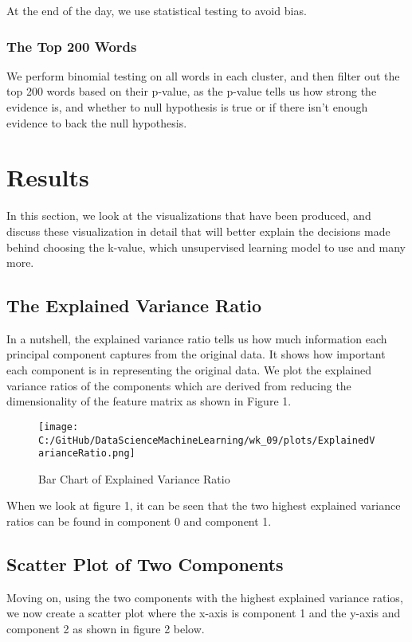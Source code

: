 \documentclass[a4paper, twocolumn]{article}
\begin{document}
\noindent At the end of the day, we use statistical testing to avoid bias.

\subsubsection{The Top 200 Words}
We perform binomial testing on all words in each cluster, and then filter out the top 200 words based on their p-value, as the p-value tells us how strong 
the evidence is, and whether to null hypothesis is true or if there isn't enough evidence to back the null hypothesis.

\section{Results}
In this section, we look at the visualizations that have been produced, and discuss these visualization in detail that will better explain the decisions made
behind choosing the k-value, which unsupervised learning model to use and many more.

\subsection{The Explained Variance Ratio}
In a nutshell, the explained variance ratio tells us how much information each principal component captures from the original data. It shows how important
each component is in representing the original data. We plot the explained variance ratios of the components which are derived from reducing the
dimensionality of the feature matrix as shown in Figure 1.

\begin{figure}[H]
    \centering
    \texttt{[image: C:/GitHub/DataScienceMachineLearning/wk\_09/plots/ExplainedVarianceRatio.png]}
    \caption{Bar Chart of Explained Variance Ratio}
\end{figure}

\vspace{1em}

\noindent When we look at figure 1, it can be seen that the two highest explained variance ratios can be found in component 0 and component 1. 

\subsection{Scatter Plot of Two Components}
Moving on, using the two components with the highest explained variance ratios, we now create a scatter plot where the x-axis is component 1 and the y-axis
and component 2 as shown in figure 2 below.
\end{document}
